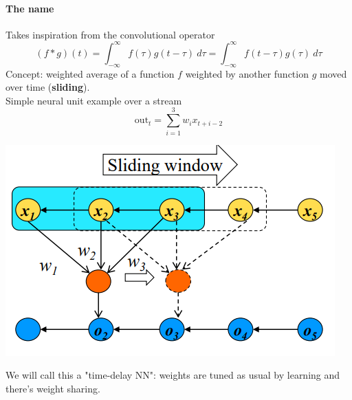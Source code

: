 \documentclass[10pt]{report}
\begin{document}
\paragraph{The name} Takes inspiration from the convolutional operator $$(f * g)(t) = \int_{-\infty}^\infty f(\tau)g(t-\tau)\:d\tau = \int_{-\infty}^\infty f(t- \tau)g(\tau)\:d\tau$$
Concept: weighted average of a function $f$ weighted by another function $g$ moved over time (\textbf{sliding}).\\Simple neural unit example over a stream
$$\text{out}_t = \sum_{i=1}^3w_ix_{t+i-2}$$
\begin{center}
	\includegraphics[scale=0.5]{26.png}
\end{center}
We will call this a "time-delay NN": weights are tuned as usual by learning and there's weight sharing.
\end{document}
